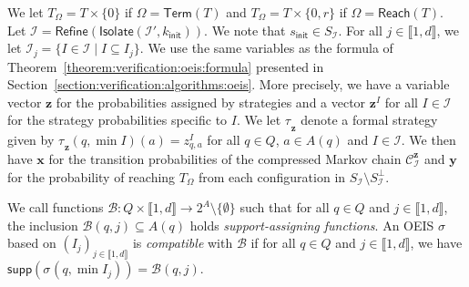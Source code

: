 \documentclass[a4paper,UKenglish,cleveref,autoref,thm-restate,colorlinks]{lipics-v2021}
\newcommand{\init}{\mathsf{init}}
\newcommand{\integerInterval}[1]{\llbracket{}#1\rrbracket{}}
\newcommand{\subsets}[1]{2^{#1}}
\newcommand{\supp}[1]{\mathsf{supp}(#1)}
\newcommand{\mdpStateSpace}{S}
\newcommand{\ocStateSpace}{Q}
\newcommand{\ocState}{q}
\newcommand{\ocCount}{k}
\newcommand{\ocConfig}{s}
\newcommand{\ocActionSpace}{A}
\newcommand{\ocAction}{a}
\newcommand{\counterUB}{r}
\newcommand{\mchain}{\mathcal{C}}
\newcommand{\intPart}{\mathcal{I}}
\newcommand{\interval}{I}
\newcommand{\intNum}{d}
\newcommand{\intIndex}{j}
\newcommand{\compressChainStrat}[1]{\mchain^{#1}_{\intPart}}
\newcommand{\compressChainStateSpace}{\mdpStateSpace_{\intPart}}
\newcommand{\compressChainStateSpaceStar}{\mdpStateSpace_{\intPart}^{\bot}}
\newcommand{\varTrans}{x}
\newcommand{\varTransTuple}{\mathbf{\varTrans}}
\newcommand{\varObj}{y}
\newcommand{\varObjTuple}{\mathbf{\varObj}}
\newcommand{\varStrat}{z}
\newcommand{\varStratI}{\mathbf{\varStrat}^{\interval}}
\newcommand{\varStratTuple}{\mathbf{\varStrat}}
\newcommand{\compressChainSymbolic}{\compressChainStrat{\varStratTuple}}
\newcommand{\suppBounded}{\mathcal{B}}
\newcommand{\objective}{\Omega}
\newcommand{\reach}[1]{\mathsf{Reach}(#1)}
\newcommand{\target}{T}
\newcommand{\termination}{\mathsf{Term}}
\newcommand{\selectiveTermination}[1]{\termination({#1})}
\newcommand{\stratGeneric}[1]{{\sigma_{#1}}}
\newcommand{\strat}{\stratGeneric{}}
\newcommand{\stratBGeneric}[1]{{\tau_{#1}}}
\newcommand{\stratB}{\stratBGeneric{}}
\begin{document}
We let $\target_\objective=\target\times\{0\}$ if $\objective=\selectiveTermination{\target}$ and $\target_\objective=\target\times\{0, \counterUB\}$ if $\objective=\reach{\target}$.
Let $\intPart=\mathsf{Refine}(\mathsf{Isolate}(\intPart', \ocCount_\init))$.
We note that $\ocConfig_\init\in\compressChainStateSpace$.
For all $\intIndex\in\integerInterval{1, \intNum}$, we let $\intPart_\intIndex = \{\interval\in\intPart\mid\interval\subseteq\interval_\intIndex\}$.
We use the same variables as the formula of Theorem~\ref{theorem:verification:oeis:formula} presented in Section~\ref{section:verification:algorithms:oeis}.
More precisely, we have a variable vector $\varStratTuple$ for the probabilities assigned by strategies and a vector $\varStratI$ for all $\interval\in\intPart$ for the strategy probabilities specific to $\interval$.
We let $\stratB_{\varStratTuple}$ denote a formal strategy given by $\stratB_{\varStratTuple}(\ocState, \min\interval)(\ocAction) = \varStrat^\interval_{\ocState, \ocAction}$ for all $\ocState\in\ocStateSpace$, $\ocAction\in\ocActionSpace(\ocState)$ and $\interval\in\intPart$.
We then have $\varTransTuple$ for the transition probabilities of the compressed Markov chain $\compressChainSymbolic$ and $\varObjTuple$ for the probability of reaching $\target_\objective$ from each configuration in $\compressChainStateSpace\setminus\compressChainStateSpaceStar$.

We call functions $\suppBounded\colon\ocStateSpace\times\integerInterval{1, \intNum}\to\subsets{\ocActionSpace}\setminus\{\emptyset\}$ such that for all $\ocState\in\ocStateSpace$ and $\intIndex\in\integerInterval{1, \intNum}$, the inclusion $\suppBounded(\ocState, \intIndex)\subseteq\ocActionSpace(\ocState)$ holds \textit{support-assigning functions}.
An OEIS $\strat$ based on $(\interval_\intIndex)_{\intIndex\in\integerInterval{1, \intNum}}$ is \textit{compatible} with $\suppBounded$ if for all $\ocState\in\ocStateSpace$ and $\intIndex\in\integerInterval{1, \intNum}$,  we have $\supp{\strat(\ocState, \min\interval_\intIndex)} = \suppBounded(\ocState, \intIndex)$.
\end{document}
